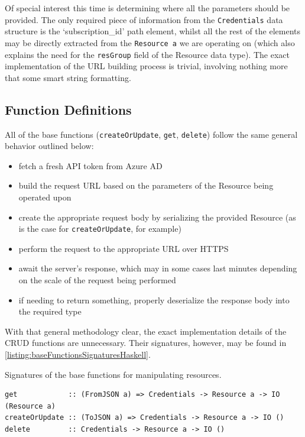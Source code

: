\documentclass[11pt]{report}
\begin{document}
Of special interest this time is determining where all the parameters should be
provided. The only required piece of information from the \texttt{Credentials}
data structure is the `subscription\_id' path element, whilst all
the rest of the elements may be directly extracted from the \texttt{Resource a}
we are operating on (which also explains the need for the \texttt{resGroup}
field of the Resource data type). \newline
The exact implementation of the URL building process is trivial, involving
nothing more that some smart string formatting.

\subsection{Function Definitions}

All of the base functions (\texttt{createOrUpdate}, \texttt{get},
\texttt{delete}) follow the same general behavior outlined below:

\begin{itemize}
    \item{} fetch a fresh API token from Azure AD
    \item{} build the request URL based on the parameters of the Resource being
        operated upon
    \item{} create the appropriate request body by serializing the provided
        Resource (as is the case for \texttt{createOrUpdate}, for example)
    \item{} perform the request to the appropriate URL over HTTPS
    \item{} await the server's response, which may in some cases last minutes
        depending on the scale of the request being performed
    \item{} if needing to return something, properly deserialize the response
        body into the required type
\end{itemize}

With that general methodology clear, the exact implementation details of the
CRUD functions are unnecessary. Their signatures, however, may be found in
\autoref{listing:baseFunctionsSignaturesHaskell}.

\begin{listing}[H]
\caption{Signatures of the base functions for manipulating resources.}
\label{listing:baseFunctionsSignaturesHaskell}
\begin{verbatim}
get            :: (FromJSON a) => Credentials -> Resource a -> IO (Resource a)
createOrUpdate :: (ToJSON a) => Credentials -> Resource a -> IO ()
delete         :: Credentials -> Resource a -> IO ()
\end{verbatim}
\end{listing}
\end{document}
